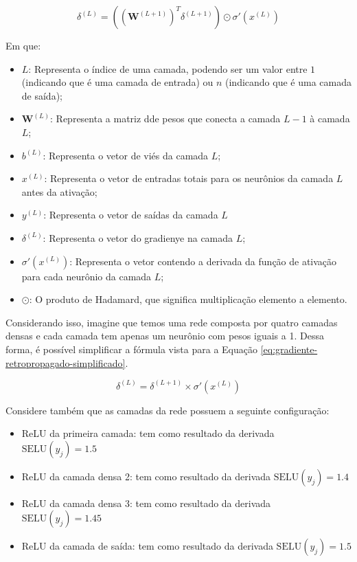 \[
    \delta^{(L)} = \left( \left( \textbf{W}^{(L+1)} \right)^T \delta^{(L+1)} \right)  \odot \sigma'(x^{(L)})
\]

Em que: 

\begin{itemize}
    \item $L$: Representa o índice de uma camada, podendo ser um valor entre $1$ (indicando que é uma camada de entrada) ou $n$ (indicando que é uma camada de saída);
    \item $\textbf{W}^{(L)}$: Representa a matriz dde pesos que conecta a camada $L - 1$ à camada $L$;
    \item $b^{(L)}$: Representa o vetor de viés da camada $L$;
    \item $x^{(L)}$: Representa o vetor de entradas totais para os neurônios da camada $L$ antes da ativação;
    \item $y^{(L)}$: Representa o vetor de saídas da camada $L$
    \item $\delta^{(L)}$: Representa o vetor do gradienye na camada $L$;
    \item $\sigma'(x^{(L)})$: Representa o vetor contendo a derivada da função de ativação para cada neurônio da camada $L$;
    \item $\odot$: O produto de Hadamard, que significa multiplicação elemento a elemento.
\end{itemize}

Considerando isso, imagine que temos uma rede composta por quatro camadas densas e cada camada tem apenas um neurônio com pesos iguais a 1. Dessa forma, é possível simplificar a fórmula vista para a Equação \ref{eq:gradiente-retropropagado-simplificado}.

\begin{equation}
        \delta^{(L)} =  \delta^{(L+1)} \times \sigma'(x^{(L)})
        \label{eq:gradiente-retropropagado-simplificado}
\end{equation}

Considere também que as camadas da rede possuem a seguinte configuração:

\begin{itemize}
    \item ReLU da primeira camada: tem como resultado da derivada $\text{SELU}(y_j) = 1.5$
    \item ReLU da camada densa 2: tem como resultado da derivada $\text{SELU}(y_j) = 1.4$
    \item ReLU da camada densa 3: tem como resultado da derivada $\text{SELU}(y_j) = 1.45$
    \item ReLU da camada de saída: tem como resultado da derivada $\text{SELU}(y_j) = 1.5$
\end{itemize}

